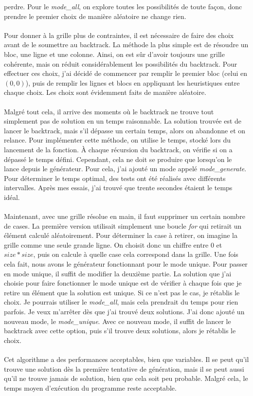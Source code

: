 \documentclass{article}
\begin{document}
 perdre. Pour le \textit{mode\_all}, on explore toutes les possibilités de 
 toute façon, donc prendre le premier choix de manière aléatoire ne change rien.
\\ \\
Pour donner à la grille plus de contraintes, il est nécessaire de faire des 
choix avant de le soumettre au backtrack. La méthode la plus simple est de 
résoudre un bloc, une ligne et une colonne. Ainsi, on est sûr d'avoir toujours 
une grille cohérente, mais on réduit considérablement les possibilités du 
backtrack. Pour effectuer ces choix, j'ai décidé de commencer par remplir le 
premier bloc (celui en $(0,0)$), puis de remplir les lignes et blocs en 
appliquant les heuristiques entre chaque choix. Les choix sont évidemment faits
de manière aléatoire.
\\ \\
Malgré tout cela, il arrive des moments où le backtrack ne trouve tout 
simplement pas de solution en un temps raisonnable. La solution trouvée est de 
lancer le backtrack, mais s'il dépasse un certain temps, alors on abandonne et 
on relance. Pour implémenter cette méthode, on utilise le temps, stocké lors du 
lancement de la fonction. À chaque récursion du backtrack, on vérifie si on a 
dépassé le temps défini. Cependant, cela ne doit se produire que lorsqu'on le 
lance depuis le générateur. Pour cela, j'ai ajouté un mode appelé 
\textit{mode\_generate}. Pour déterminer le temps optimal, des tests ont été 
réalisés avec différents intervalles. Après mes essais, j'ai trouvé que trente 
secondes étaient le temps idéal.
\\ \\
Maintenant, avec une grille résolue en main, il faut supprimer un certain nombre
de cases. La première version utilisait simplement une boucle \textit{for} qui
retirait un élément calculé aléatoirement. Pour déterminer la case à retirer, 
on imagine la grille comme une seule grande ligne. On choisit donc un chiffre 
entre $0$ et $size*size$, puis on calcule à quelle case cela correspond dans 
la grille. Une fois cela fait, nous avons le générateur fonctionnant pour le 
mode unique. Pour passer en mode unique, il suffit de modifier la deuxième 
partie. La solution que j'ai choisie pour faire fonctionner le mode unique 
est de vérifier à chaque fois que je retire un élément que la solution est 
unique. Si ce n'est pas le cas, je rétablis le choix. Je pourrais utiliser le 
\textit{mode\_all}, mais cela prendrait du temps pour rien parfois. Je veux 
m'arrêter dès que j'ai trouvé deux solutions. J'ai donc ajouté un nouveau mode,
le \textit{mode\_unique}. Avec ce nouveau mode, il suffit de lancer le backtrack 
avec cette option, puis s'il trouve deux solutions, alors je rétablis le choix.
\\ \\
Cet algorithme a des performances acceptables, bien que variables. Il se peut 
qu'il trouve une solution dès la première tentative de génération, mais il se 
peut aussi qu'il ne trouve jamais de solution, bien que cela soit peu probable.
Malgré cela, le temps moyen d'exécution du programme reste acceptable.
\end{document}
